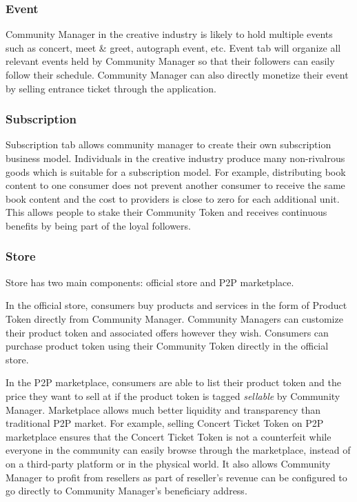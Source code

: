 \documentclass[letterpaper,11pt]{article}
\begin{document}
\subsubsection{Event}
Community Manager in the creative industry is likely to hold multiple events such as concert, meet \& greet, autograph event, etc. Event tab will organize all relevant events held by Community Manager so that their followers can easily follow their schedule. Community Manager can also directly monetize their event by selling entrance ticket through the application.

\subsubsection{Subscription}
Subscription tab allows community manager to create their own subscription business model. Individuals in the creative industry produce many non-rivalrous goods which is suitable for a subscription model. For example, distributing book content to one consumer does not prevent another consumer to receive the same book content and the cost to providers is close to zero for each additional unit. This allows people to stake their Community Token and receives continuous benefits by being part of the loyal followers.

\subsubsection{Store}
Store has two main components: official store and P2P marketplace.

In the official store, consumers buy products and services in the form of Product Token directly from Community Manager. Community Managers can customize their product token and associated offers however they wish. Consumers can purchase product token using their Community Token directly in the official store.

In the P2P marketplace, consumers are able to list their product token and the price they want to sell at if the product token is tagged \textit{sellable} by Community Manager. Marketplace allows much better liquidity and transparency than traditional P2P market. For example, selling Concert Ticket Token on P2P marketplace ensures that the Concert Ticket Token is not a counterfeit while everyone in the community can easily browse through the marketplace, instead of on a third-party platform or in the physical world. It also allows Community Manager to profit from resellers as part of reseller's revenue can be configured to go directly to Community Manager’s beneficiary address.
\end{document}
